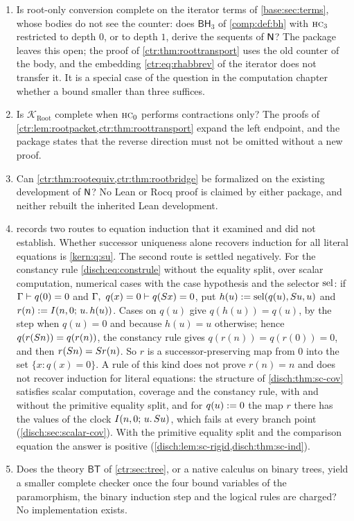 \begin{question}\label{ctr:q:root}
\begin{enumerate}
\item Is root-only conversion complete on the iterator terms of \cref{base:sec:terms}, whose
bodies do not see the counter: does $\mathsf{BH}_3$ of \cref{comp:def:bh} with
$\rulename{HC}_3$ restricted to depth $0$, or to depth $1$, derive the sequents of $\mathsf{N}$?
The package  leaves this open; the proof of \cref{ctr:thm:roottransport} uses the old
counter of the body, and the embedding \eqref{ctr:eq:rhabbrev} of the iterator does not
transfer it. It is a special case of the question in the computation chapter whether a bound
smaller than three suffices.
\item Is $\mathcal K_{\mathrm{Root}}$ complete when $\rulename{HC}_0$ performs contractions
only? The proofs of \cref{ctr:lem:rootpacket,ctr:thm:roottransport} expand the left endpoint,
and the package states that the reverse direction must not be omitted without a new proof.
\item Can \cref{ctr:thm:rootequiv,ctr:thm:rootbridge} be formalized on the existing development
of $\mathsf{N}$? No Lean or Rocq proof is claimed by either package, and neither rebuilt the
inherited Lean development.
\item {} records two routes to equation induction that it examined and
did not establish. Whether successor uniqueness alone recovers induction for all literal
equations is \cref{kern:q:su}. The second route is settled negatively. For the constancy rule
\eqref{disch:eq:construle} without the equality split, over scalar computation, numerical cases
with the case hypothesis and the selector $\operatorname{sel}$: if $\Gamma\vdash q(0)=0$ and
$\Gamma,\ q(x)=0\vdash q(S x)=0$, put $h(u)\mathrel{:=}\operatorname{sel}(q(u),S u,u)$ and
$r(n)\mathrel{:=}I(n,0;\,u.\,h(u))$. Cases on $q(u)$ give $q(h(u))=q(u)$, by the step when $q(u)=0$
and because $h(u)=u$ otherwise; hence $q(r(S n))=q(r(n))$, the constancy rule gives
$q(r(n))=q(r(0))=0$, and then $r(S n)=S r(n)$. So $r$ is a successor-preserving map from
$0$ into the set $\{x: q(x)=0\}$. A rule of this kind does not prove $r(n)=n$ and does not
recover induction for literal equations: the structure of \cref{disch:thm:sc-cov} satisfies
scalar computation, coverage and the constancy rule, with and without the primitive equality
split, and for $q(u)\mathrel{:=} 0$ the map $r$ there has the values of the clock
$I(n,0;\,u.\,S u)$, which fails at every branch point (\cref{disch:sec:scalar-cov}). With
the primitive equality split and the comparison equation the answer is positive
(\cref{disch:lem:sc-rigid,disch:thm:sc-ind}).
\item Does the theory $\mathsf{BT}$ of \cref{ctr:sec:tree}, or a native calculus on binary
trees, yield a smaller complete checker once the four bound variables of the paramorphism, the
binary induction step and the logical rules are charged? No implementation exists.
\end{enumerate}
\end{question}

